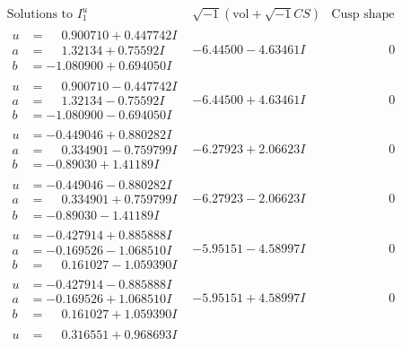 \documentclass[1p]{elsarticle_modified}
\theoremstyle{definition}
\newcommand{\I}{\sqrt{-1}}
\begin{document}
$$\begin{array}{c|c|c}  
\text{Solutions to }I^u_{1}& \I (\text{vol} + \sqrt{-1}CS) & \text{Cusp shape}\\
 \hline 
\begin{aligned}
u &= \phantom{-}0.900710 + 0.447742 I \\
a &= \phantom{-}1.32134 + 0.75592 I \\
b &= -1.080900 + 0.694050 I\end{aligned}
 & -6.44500 - 4.63461 I & \phantom{-0.000000 } 0 \\ \hline\begin{aligned}
u &= \phantom{-}0.900710 - 0.447742 I \\
a &= \phantom{-}1.32134 - 0.75592 I \\
b &= -1.080900 - 0.694050 I\end{aligned}
 & -6.44500 + 4.63461 I & \phantom{-0.000000 } 0 \\ \hline\begin{aligned}
u &= -0.449046 + 0.880282 I \\
a &= \phantom{-}0.334901 - 0.759799 I \\
b &= -0.89030 + 1.41189 I\end{aligned}
 & -6.27923 + 2.06623 I & \phantom{-0.000000 } 0 \\ \hline\begin{aligned}
u &= -0.449046 - 0.880282 I \\
a &= \phantom{-}0.334901 + 0.759799 I \\
b &= -0.89030 - 1.41189 I\end{aligned}
 & -6.27923 - 2.06623 I & \phantom{-0.000000 } 0 \\ \hline\begin{aligned}
u &= -0.427914 + 0.885888 I \\
a &= -0.169526 - 1.068510 I \\
b &= \phantom{-}0.161027 - 1.059390 I\end{aligned}
 & -5.95151 - 4.58997 I & \phantom{-0.000000 } 0 \\ \hline\begin{aligned}
u &= -0.427914 - 0.885888 I \\
a &= -0.169526 + 1.068510 I \\
b &= \phantom{-}0.161027 + 1.059390 I\end{aligned}
 & -5.95151 + 4.58997 I & \phantom{-0.000000 } 0 \\ \hline\begin{aligned}
u &= \phantom{-}0.316551 + 0.968693 I \\

\end{aligned}
\end{array}$$
\end{document}
